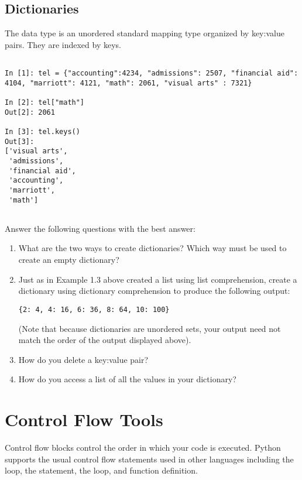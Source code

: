 \subsection*{Dictionaries}
\begin{example}

The  data type is an unordered standard mapping type 
organized by key:value pairs. They are indexed by keys. 

\begin{lstlisting}

In [1]: tel = {"accounting":4234, "admissions": 2507, "financial aid": 4104, "marriott": 4121, "math": 2061, "visual arts" : 7321} 

In [2]: tel["math"]
Out[2]: 2061

In [3]: tel.keys()
Out[3]: 
['visual arts',
 'admissions',
 'financial aid',
 'accounting',
 'marriott',
 'math']
 
\end{lstlisting}
\end{example}

\begin{problem}
Answer the following questions with the best answer:
\begin{enumerate}
\item What are the two ways to create dictionaries? Which way must be used to
create an empty dictionary?
\item Just as in Example 1.3 above created a list using list comprehension, 
create a dictionary using dictionary comprehension to produce the following output:

\begin{lstlisting}
{2: 4, 4: 16, 6: 36, 8: 64, 10: 100}
\end{lstlisting}

(Note that because dictionaries are unordered sets, your output need not match the 
order of the output displayed above).
\item How do you delete a key:value pair?
\item How do you access a list of all the values in your dictionary? 

\end{enumerate}
\end{problem}


\section*{Control Flow Tools}

Control flow blocks control the order in which your code is executed.
Python supports the usual control flow statements used in other languages
including the  loop, the  statement, the  loop, 
and function definition. 


